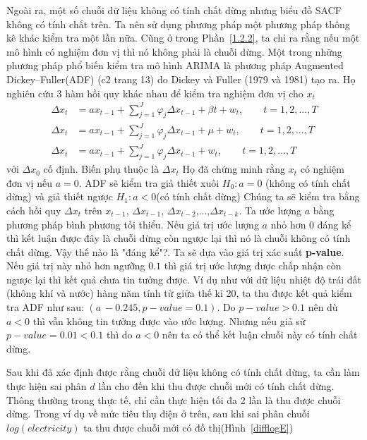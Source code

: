 \documentclass[twoside,12pt]{Latex/Classes/PhDthesisPSnPDF}
\begin{document}
Ngoài ra, một số chuỗi dữ liệu không có tính chất dừng nhưng biểu đồ SACF không có tính chất trên. Ta nên sử dụng phương pháp một phương pháp thông kê khác kiểm tra một lần nữa. Cũng ở trong Phần~\ref{1.2.2}, ta chỉ ra rằng nếu một mô hình có nghiệm đơn vị thì nó không phải là chuỗi dừng. Một trong những phương pháp phổ biến kiểm tra mô hình ARIMA là phương pháp Augmented Dickey–Fuller(ADF) (c2 trang 13) do Dickey và Fuller (1979 và 1981) tạo ra. Họ nghiên cứu 3 hàm hồi quy khác nhau để kiểm tra nghiệm đơn vị cho $x_t$
\begin{align}
\Delta{x_t} &= ax_{t-1} + \sum\limits^{J}_{j=1}\varphi_{j}\Delta{x_{t-1}}+ \beta{t} + w_t, \qquad t = 1,2,...,T \\
\Delta{x_t} &= ax_{t-1} + \sum\limits^{J}_{j=1}\varphi_{j}\Delta{x_{t-1}}+ \mu + w_t , \qquad t = 1,2,...,T\\
\Delta{x_t} &= ax_{t-1} + \sum\limits^{J}_{j=1}\varphi_{j}\Delta{x_{t-1}} + w_t, \qquad t = 1,2,...,T
\end{align}
với $\Delta{x_0}$ cố định. Biến phụ thuộc là $\Delta{x_t}$ Họ đã chứng minh rằng $x_t$ có nghiệm đơn vị nếu $a=0$. ADF sẽ kiểm tra giả thiết xuôi $H_0: a = 0$ (không có tính chất dừng) và giả thiết ngược $H_1: a < 0$(có tính chất dừng)
Chúng ta sẽ kiểm tra bằng cách hồi quy $\Delta{x_t}$ trên $x_{t-1}$, $\Delta{x_{t-1}}$, $\Delta{x_{t-2}}$,...,$\Delta{x_{t-k}}$. Ta ước lượng $a$ bằng phương pháp bình phương tối thiểu. Nếu giá trị ước lượng $a$ nhỏ hơn $0$ đáng kể thì kết luận được đây là chuỗi dừng còn ngược lại thì nó là chuỗi không có tính chất dừng. Vậy thế nào là "đáng kể"?. Ta sẽ dựa vào giá trị xác suất \textbf{p-value}. Nếu giá trị này nhỏ hơn ngưỡng $0.1$ thì giá trị ước lượng được chấp nhận còn ngược lại thì kết quả chưa tin tưởng được. Ví dụ như với dữ liệu nhiệt độ trái đất (không khí và nước) hàng năm tính từ giữa thế kỉ 20, ta thu được kết quả kiểm tra ADF như sau: $(a ~ -0.245 , p-value = 0.1)$. Do $p-value > 0.1$ nên dù $a<0$ thì vẫn không tin tưởng được vào ước lượng. Nhưng nếu giả sử $p-value = 0.01 < 0.1$ thì do $a<0$ nên ta có thể kết luận chuỗi này có tính chất dừng.

Sau khi đã xác định được rằng chuỗi dữ liệu không có tính chất dừng, ta cần làm thực hiện sai phân $d$ lần cho đến khi thu được chuỗi mới có tính chất dừng. Thông thường trong thực tế, chỉ cần thực hiện tối đa 2 lần là thu được chuỗi dừng. Trong ví dụ về mức tiêu thụ điện ở trên, sau khi sai phân chuỗi $log(electricity)$ ta thu được chuỗi mới có đồ thị(Hình~\ref{difflogE}) 
\end{document}
